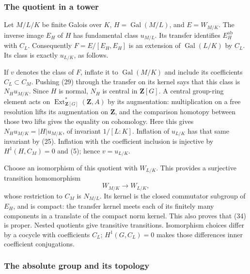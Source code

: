 \documentclass[11pt,a4paper]{article}
\begin{document}
\subsubsection{The quotient in a tower}\label{the-quotient-in-a-tower}

Let \(M/L/K\) be finite Galois over \(K\),
\(H=\operatorname{Gal}(M/L)\), and \(E=W_{M/K}\). The inverse image
\(E_H\) of \(H\) has fundamental class \(u_{M/L}\). Its transfer
identifies \(E_H^{\mathrm{ab}}\) with \(C_L\). Consequently
\(F=E/[E_H,E_H]\) is an extension of \(\operatorname{Gal}(L/K)\) by
\(C_L\). Its class is exactly \(u_{L/K}\), as follows.

If \(v\) denotes the class of \(F\), inflate it to
\(\operatorname{Gal}(M/K)\) and include its coefficients
\(C_L\subset C_M\). Pushing (29) through the transfer on its kernel says
that this class is \(N_Hu_{M/K}\). Since \(H\) is normal, \(N_H\) is
central in \(\mathbf Z[G]\). A central group-ring element acts on
\(\operatorname{Ext}_{\mathbf Z[G]}^*(\mathbf Z,A)\) by its
augmentation: multiplication on a free resolution lifts its augmentation
on \(\mathbf Z\), and the comparison homotopy between those two lifts
gives the equality on cohomology. Here this gives
\(N_Hu_{M/K}=|H|u_{M/K}\), of invariant \(1/[L:K]\). Inflation of
\(u_{L/K}\) has that same invariant by (25). Inflation with the
coefficient inclusion is injective by \(H^1(H,C_M)=0\) and (5); hence
\(v=u_{L/K}\).

Choose an isomorphism of this quotient with \(W_{L/K}\). This provides a
surjective transition homomorphism \[
W_{M/K}\longrightarrow W_{L/K},
\tag{34}
\] whose restriction to \(C_M\) is \(N_{M/L}\). Its kernel is the closed
commutator subgroup of \(E_H\), and is compact: the transfer kernel
meets each of its finitely many components in a translate of the compact
norm kernel. This also proves that (34) is proper. Nested quotients give
transitive transitions. Isomorphism choices differ by a cocycle with
coefficients \(C_L\); \(H^1(G,C_L)=0\) makes those differences inner
coefficient conjugations.

\subsubsection{The absolute group and its
topology}\label{the-absolute-group-and-its-topology}
\end{document}
